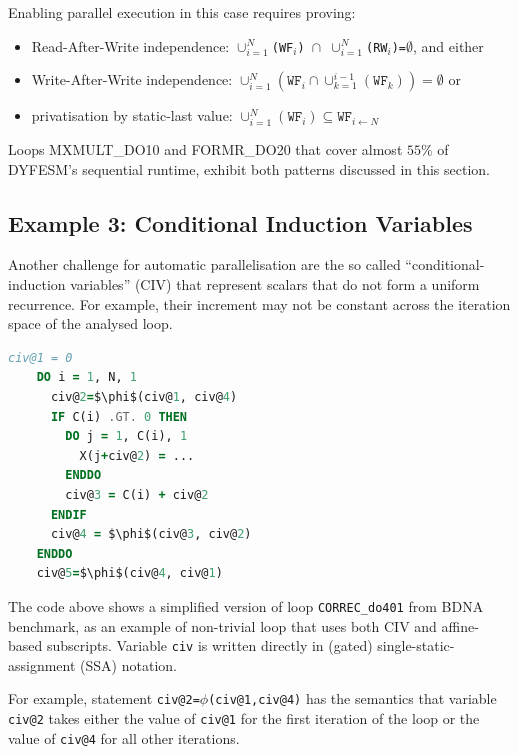 Enabling parallel execution in this case requires proving:
\begin{itemize}
\item Read-After-Write independence: \texttt{$\cup_{i=1}^N$(WF$_i$)
    $\cap$ $\cup_{i=1}^{N}$(RW$_i$)=$\emptyset$}, and either
\item Write-After-Write independence:
  $\cup_{i=1}^{N}(\texttt{WF}_i \cap \cup_{k=1}^{i-1}(\texttt{WF}_k))=\emptyset$ or
\item privatisation by static-last value:
  $\cup_{i=1}^{N}(\texttt{WF}_i) \subseteq\texttt{WF}_{i\leftarrow N}$
\end{itemize}

Loops MXMULT\_DO10 and FORMR\_DO20 that cover almost $55\%$ of
DYFESM's sequential runtime, exhibit both patterns discussed in this
section.

\subsection{Example 3: Conditional Induction Variables}
\label{subsec:eg3}

Another challenge for automatic parallelisation are the so called
``conditional-induction variables'' (CIV) that represent scalars that
do not form a uniform recurrence.  For example, their increment may
not be constant across the iteration space of the analysed loop.

\begin{lstlisting}[xleftmargin=0pt,language=fortran,mathescape=true,escapechar=|]
    civ@1 = 0
    DO i = 1, N, 1
      civ@2=$\phi$(civ@1, civ@4)
      IF C(i) .GT. 0 THEN
        DO j = 1, C(i), 1
          X(j+civ@2) = ...
        ENDDO
        civ@3 = C(i) + civ@2
      ENDIF
      civ@4 = $\phi$(civ@3, civ@2)
    ENDDO
    civ@5=$\phi$(civ@4, civ@1)
\end{lstlisting}

The code above shows a simplified version of loop
\texttt{CORREC\_do401} from BDNA benchmark, as an example of
non-trivial loop that uses both CIV and affine-based subscripts.
Variable \texttt{civ} is written directly in (gated)
single-static-assignment (SSA) notation.

For example, statement \texttt{civ@2=$\phi$(civ@1,civ@4)} has the
semantics that variable \texttt{civ@2} takes either the value of
\texttt{civ@1} for the first iteration of the loop or the value of
\texttt{civ@4} for all other iterations.

